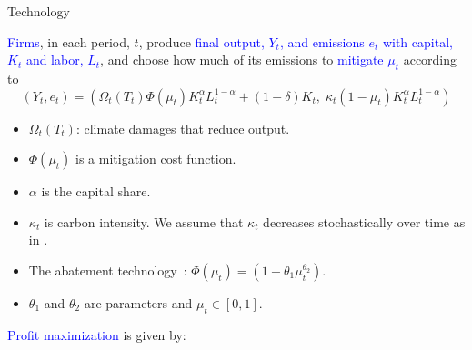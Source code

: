 \documentclass[aspectratio=1610]{beamer}
\newcommand{\blup}[1]{\textcolor{uzhgreydark}{#1}}
\let\citeOld\cite %
\renewcommand{\cite}[1]{{\blup{\citeOld{#1}}}}
\begin{document}
\begin{frame}[fragile]{Technology}
\begin{footnotesize}

\textcolor{blue}{Firms}, in each period, $t$, produce \textcolor{blue}{final output, $Y_{t}$, and emissions $e_t$ with capital, $K_{t}$ and labor, $L_{t}$}, and choose how much of its emissions to \textcolor{blue}{mitigate $\mu_t$} according to 
%
\begin{equation} \label{eqFinalOutput} 
(Y_t, e_t) = (\Omega_t(T_{t}) \Phi(\mu_t)
 K_t^{\alpha} L_t^{1-\alpha} + (1- \delta) K_t, \; \kappa_t (1-\mu_t)
 K_t^{\alpha} L_t^{1-\alpha})
\end{equation}
%
\begin{footnotesize}
    \begin{itemize}
\item $\Omega_t(T_{t})$: climate damages that reduce output.
\item $\Phi(\mu_t)$ is a mitigation cost function.
\item $\alpha$ is the capital share.
\item $\kappa_t$ is carbon intensity. We assume that $\kappa_t$ decreases stochastically over time as in \cite{kotlikoffParetoimprovingCarbonriskTaxation2021a}.
\item The abatement technology~\citep[{adapted from}][]{Nordhaus2017}: $\Phi(\mu_t) = (1-\theta_{1}\mu_t^{\theta_2})$.
\item $\theta_{1}$ and $\theta_2$ are parameters and $\mu_t \in [0, 1]$.
\end{itemize}
\end{footnotesize}

\vspace{0.5cm}
\textcolor{blue}{Profit maximization} is given by:


\end{footnotesize}
\end{frame}
\end{document}
